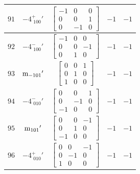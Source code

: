 \documentclass[fleqn,8pt]{jsarticle}
\begin{document}
\begin{longtable}{ccccc}
$ 91 $ & $ -4^{+}_{\,\,100}{}' $ & $ \begin{bmatrix} -1 & 0 & 0 \\ 0 & 0 & 1 \\ 0 & -1 & 0 \end{bmatrix} $ & $ -1 $ & $ -1 $ \\ \hline
$ 92 $ & $ -4^{-}_{\,\,100}{}' $ & $ \begin{bmatrix} -1 & 0 & 0 \\ 0 & 0 & -1 \\ 0 & 1 & 0 \end{bmatrix} $ & $ -1 $ & $ -1 $ \\ \hline
$ 93 $ & $ {\rm m}_{-101}{}' $ & $ \begin{bmatrix} 0 & 0 & 1 \\ 0 & 1 & 0 \\ 1 & 0 & 0 \end{bmatrix} $ & $ -1 $ & $ -1 $ \\ \hline
$ 94 $ & $ -4^{-}_{\,\,010}{}' $ & $ \begin{bmatrix} 0 & 0 & 1 \\ 0 & -1 & 0 \\ -1 & 0 & 0 \end{bmatrix} $ & $ -1 $ & $ -1 $ \\ \hline
$ 95 $ & $ {\rm m}_{101}{}' $ & $ \begin{bmatrix} 0 & 0 & -1 \\ 0 & 1 & 0 \\ -1 & 0 & 0 \end{bmatrix} $ & $ -1 $ & $ -1 $ \\ \hline
$ 96 $ & $ -4^{+}_{\,\,010}{}' $ & $ \begin{bmatrix} 0 & 0 & -1 \\ 0 & -1 & 0 \\ 1 & 0 & 0 \end{bmatrix} $ & $ -1 $ & $ -1 $ \\
\end{longtable}
\end{document}
